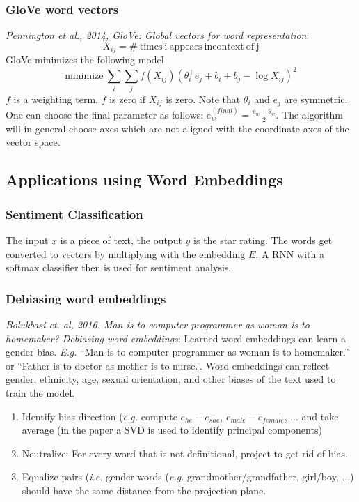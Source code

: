 \documentclass{article}
\begin{document}
\subsubsection{GloVe word vectors}
\emph{Pennington et al., 2014, GloVe: Global vectors for word representation}:
\begin{equation}
  X_{ij}=\mathrm{\#\ times\ i\ appears\ in context\ of\ j}
\end{equation}
GloVe minimizes the following model
\begin{equation}
  \mathrm{minimize\ }\sum_i\sum_jf(X_{ij})(\theta_i^\top e_j + b_i + b_j - \log X_{ij})^2
\end{equation}
$f$ is a weighting term. $f$ is zero if $X_{ij}$ is zero.
Note that $\theta_i$ and $e_j$ are symmetric.
One can choose the final parameter as follows: $e_w^{(final)}=\frac{e_w+\theta_w}{2}$.
The algorithm will in general choose axes which are not aligned with the coordinate axes of the vector space.

\subsection{Applications using Word Embeddings}
\subsubsection{Sentiment Classification}
The input $x$ is a piece of text, the output $y$ is the star rating.
The words get converted to vectors by multiplying with the embedding $E$.
A RNN with a softmax classifier then is used for sentiment analysis.

\subsubsection{Debiasing word embeddings}
\emph{Bolukbasi et. al, 2016. Man is to computer programmer as woman is to homemaker? Debiasing word embeddings}:
Learned word embeddings can learn a gender bias.
\emph{E.g.} ``Man is to computer programmer as woman is to homemaker.'' or
``Father is to doctor as mother is to nurse.''.
Word embeddings can reflect gender, ethnicity, age, sexual orientation, and other biases of the text used to train the model.
\begin{enumerate}
  \item Identify bias direction (\emph{e.g.} compute $e_{he}-e_{she}$, $e_{male}-e_{female}$, ... and take average
    (in the paper a SVD is used to identify principal components)
  \item Neutralize: For every word that is not definitional, project to get rid of bias.
  \item Equalize pairs (\emph{i.e.} gender words (\emph{e.g.} grandmother/grandfather, girl/boy, ...)
    should have the same distance from the projection plane.
\end{enumerate}
\end{document}
